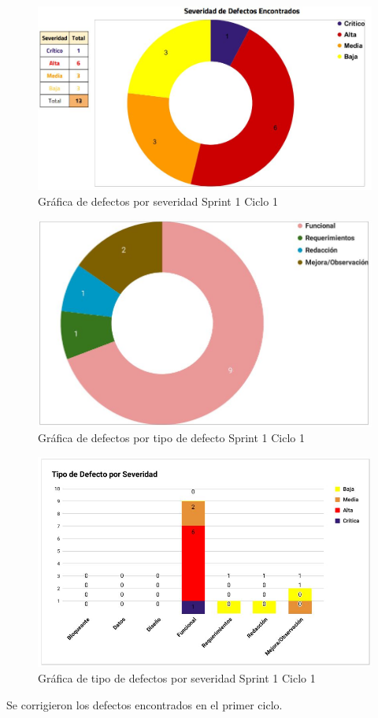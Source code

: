 \newpage

\begin{figure}[H]
	\begin{center}
		\includegraphics[width=.85\textwidth]{images/pruebas/s1c1-1}
		\caption{Gráfica de defectos por severidad Sprint 1 Ciclo 1}
		\label{fig:infos1c1-1}
	\end{center}
\end{figure}

\begin{figure}[H]
	\begin{center}
		\includegraphics[width=.75\textwidth]{images/pruebas/s1c1-2}
		\caption{Gráfica de defectos por tipo de defecto Sprint 1 Ciclo 1}
		\label{fig:infos1c1-2}
	\end{center}
\end{figure}

\newpage

\begin{figure}[H]
	\begin{center}
		\includegraphics[width=.95\textwidth]{images/pruebas/s1c1-3}
		\caption{Gráfica de tipo de defectos por severidad Sprint 1 Ciclo 1}
		\label{fig:infos1c1-3}
	\end{center}
\end{figure}

Se corrigieron los defectos encontrados en el primer ciclo.
